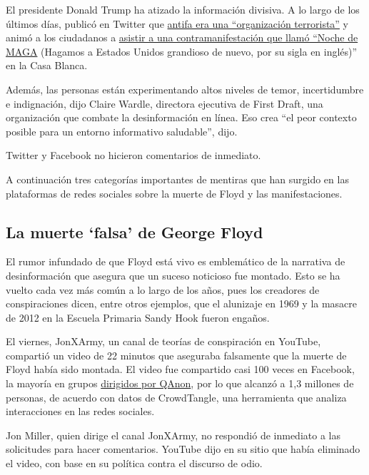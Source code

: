 El presidente Donald Trump ha atizado la información divisiva. A lo
largo de los últimos días, publicó en Twitter que
\href{https://www.nytimes.com/reuters/2020/05/31/us/31reuters-minneapolis-police-trump-antifa.html}{antifa
era una ``organización terrorista''} y animó a los ciudadanos a
\href{https://www.nytimes.com/2020/05/30/us/politics/trump-threatens-protesters-dogs-weapons.html}{asistir
a una contramanifestación que llamó ``Noche de MAGA} (Hagamos a Estados
Unidos grandioso de nuevo, por su sigla en inglés)'' en la Casa Blanca.

Además, las personas están experimentando altos niveles de temor,
incertidumbre e indignación, dijo Claire Wardle, directora ejecutiva de
First Draft, una organización que combate la desinformación en línea.
Eso crea ``el peor contexto posible para un entorno informativo
saludable'', dijo.

Twitter y Facebook no hicieron comentarios de inmediato.

A continuación tres categorías importantes de mentiras que han surgido
en las plataformas de redes sociales sobre la muerte de Floyd y las
manifestaciones.

\hypertarget{la-muerte-falsa-de-george-floyd}{%
\subsection{La muerte `falsa' de George
Floyd}\label{la-muerte-falsa-de-george-floyd}}

El rumor infundado de que Floyd está vivo es emblemático de la narrativa
de desinformación que asegura que un suceso noticioso fue montado. Esto
se ha vuelto cada vez más común a lo largo de los años, pues los
creadores de conspiraciones dicen, entre otros ejemplos, que el
alunizaje en 1969 y la masacre de 2012 en la Escuela Primaria Sandy Hook
fueron engaños.

El viernes, JonXArmy, un canal de teorías de conspiración en YouTube,
compartió un video de 22 minutos que aseguraba falsamente que la muerte
de Floyd había sido montada. El video fue compartido casi 100 veces en
Facebook, la mayoría en grupos
\href{https://www.nytimes.com/2020/02/09/us/politics/qanon-trump-conspiracy-theory.html}{dirigidos
por QAnon}, por lo que alcanzó a 1,3 millones de personas, de acuerdo
con datos de CrowdTangle, una herramienta que analiza interacciones en
las redes sociales.

Jon Miller, quien dirige el canal JonXArmy, no respondió de inmediato a
las solicitudes para hacer comentarios. YouTube dijo en su sitio que
había eliminado el video, con base en su política contra el discurso de
odio.

